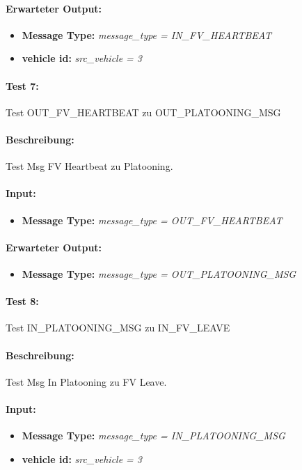 \documentclass[a4paper, 12pt, titlepage]{scrartcl}
\begin{document}
{			\paragraph{Erwarteter Output:}
			\begin{itemize} \itemsep-0.5em
				\item \textbf{Message Type:} \emph{message\_type = IN\_FV\_HEARTBEAT}
				\item \textbf{vehicle id:} \emph{src\_vehicle = 3}
			\end{itemize}

			\paragraph{Test 7:}{Test OUT\_FV\_HEARTBEAT zu OUT\_PLATOONING\_MSG}
			\paragraph{Beschreibung:} Test Msg FV Heartbeat zu Platooning.
			\paragraph{Input:}
			\begin{itemize} \itemsep-0.5em
				\item \textbf{Message Type:} \emph{message\_type = OUT\_FV\_HEARTBEAT}
			\end{itemize}
			\paragraph{Erwarteter Output:}
			\begin{itemize} \itemsep-0.5em
				\item \textbf{Message Type:} \emph{message\_type = OUT\_PLATOONING\_MSG}
			\end{itemize}

			\paragraph{Test 8:}{Test IN\_PLATOONING\_MSG zu IN\_FV\_LEAVE}
			\paragraph{Beschreibung:} Test Msg In Platooning zu FV Leave.
			\paragraph{Input:}
			\begin{itemize} \itemsep-0.5em
				\item \textbf{Message Type:} \emph{message\_type = IN\_PLATOONING\_MSG}
				\item \textbf{vehicle id:} \emph{src\_vehicle = 3}
			\end{itemize}
}
\end{document}
